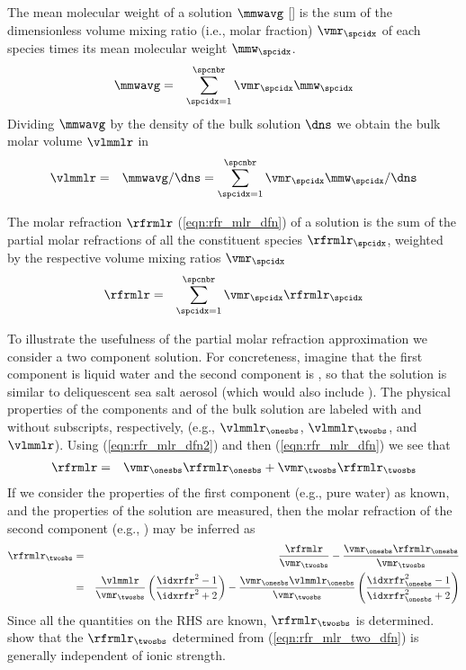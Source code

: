 \documentclass[12pt,twoside]{book}
\begin{document}
The mean molecular weight of a solution $\mmwavg$ [\kgxmol] is the sum
of the dimensionless volume mixing ratio (i.e., molar fraction)
$\vmr_{\spcidx}$ of each species times its mean molecular weight
$\mmw_{\spcidx}$.
\begin{eqnarray}
\mmwavg & = & 
\sum_{\spcidx = 1}^{\spcnbr} \vmr_{\spcidx} \mmw_{\spcidx}
\label{eqn:mmw_avg_dfn}
\end{eqnarray}
Dividing $\mmwavg$ by the density of the bulk solution $\dns$ we
obtain the bulk molar volume $\vlmmlr$ in \mCxmol
\begin{eqnarray}
\vlmmlr
& = & 
\mmwavg / \dns
=
\sum_{\spcidx = 1}^{\spcnbr} \vmr_{\spcidx} \mmw_{\spcidx} / \dns
\label{eqn:vlm_mlr_dfn2}
\end{eqnarray}

The molar refraction $\rfrmlr$ (\ref{eqn:rfr_mlr_dfn}) of a solution 
is the sum of the partial molar refractions of all the constituent
species $\rfrmlr_{\spcidx}$, weighted by the respective volume mixing
ratios $\vmr_{\spcidx}$
\begin{eqnarray}
\rfrmlr & = & 
\sum_{\spcidx = 1}^{\spcnbr} \vmr_{\spcidx} \rfrmlr_{\spcidx}
\label{eqn:rfr_mlr_dfn2}
\end{eqnarray}

To illustrate the usefulness of the partial molar refraction
approximation we consider a two component solution.
For concreteness, imagine that the first component is liquid water and 
the second component is \NaCl, so that the solution is similar to
deliquescent sea salt aerosol (which would also include \MgSOq).
The physical properties of the components and of the bulk solution are  
labeled with and without subscripts, respectively, (e.g.,
$\vlmmlr_{\onesbs}$, $\vlmmlr_{\twosbs}$, and $\vlmmlr$).
Using (\ref{eqn:rfr_mlr_dfn2}) and then (\ref{eqn:rfr_mlr_dfn}) we 
see that
\begin{eqnarray}
\rfrmlr & = & \vmr_{\onesbs} \rfrmlr_{\onesbs}
+ \vmr_{\twosbs} \rfrmlr_{\twosbs} \nonumber
\label{eqn:rfr_mlr_dfn3}
\end{eqnarray}
If we consider the properties of the first component (e.g., pure
water) as known, and the properties of the solution are measured,
then the molar refraction of the second component (e.g., \NaCl) may be 
inferred as
\begin{eqnarray}
\rfrmlr_{\twosbs} & = & \frac{\rfrmlr}{\vmr_{\twosbs}} - 
\frac{\vmr_{\onesbs}\rfrmlr_{\onesbs}}{\vmr_{\twosbs}} \nonumber \\
& = & \frac{\vlmmlr}{\vmr_{\twosbs}}
\left( \frac{\idxrfr^{2} -1}{\idxrfr^{2} + 2} \right)
- \frac{\vmr_{\onesbs}\vlmmlr_{\onesbs}}{\vmr_{\twosbs}} 
\left( \frac{\idxrfr_{\onesbs}^{2} -1}{\idxrfr_{\onesbs}^{2} + 2} \right)
\label{eqn:rfr_mlr_two_dfn}
\end{eqnarray}
Since all the quantities on the RHS are known, $\rfrmlr_{\twosbs}$ is
determined. 
\cite{Ste90} show that the $\rfrmlr_{\twosbs}$ determined from 
(\ref{eqn:rfr_mlr_two_dfn}) is generally independent of ionic
strength. 
\end{document}
